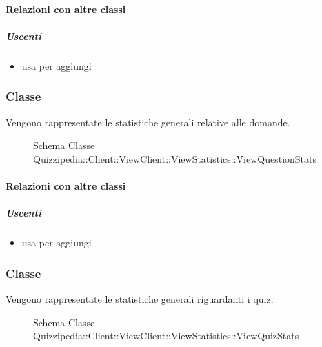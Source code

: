 \paragraph{Relazioni con altre classi}
\subparagraph{Uscenti}
\begin{itemize}
\item usa  per aggiungi
\end{itemize}
\subsubsection{Classe }
Vengono rappresentate le statistiche generali relative alle domande.
\begin{figure}[H]
\centering
\noindent{}
\caption[Schema Classe ViewQuestionStats]{Schema Classe Quizzipedia::Client::ViewClient::ViewStatistics::ViewQuestionStats}
\end{figure}
\paragraph{Relazioni con altre classi}
\subparagraph{Uscenti}
\begin{itemize}
\item usa  per aggiungi
\end{itemize}
\subsubsection{Classe }
Vengono rappresentate le statistiche generali riguardanti i quiz.
\begin{figure}[H]
\centering
\noindent{}
\caption[Schema Classe ViewQuizStats]{Schema Classe Quizzipedia::Client::ViewClient::ViewStatistics::ViewQuizStats}
\end{figure}
